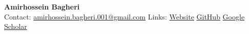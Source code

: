 \begin{center}
  {\LARGE\bfseries Amirhossein Bagheri}\\[5pt]
  {\small
    Contact: \href{mailto:amirhossein.bagheri.001@gmail.com}{amirhossein.bagheri.001@gmail.com}
    \qquad Links:
    \href{https://ahbagheri01.github.io/}{Website}
    \quad \href{https://github.com/ahbagheri01}{GitHub}
    \quad
    \href{https://scholar.google.com/citations?user=Rn8MktAAAAAJ\&hl=en}{Google Scholar}
  }
\end{center}
\vspace{-5pt}
